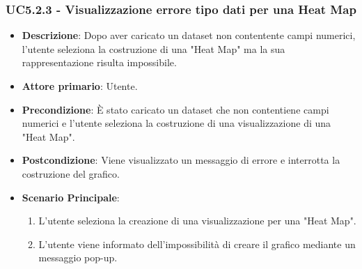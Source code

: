 \subsubsection{UC5.2.3 - Visualizzazione errore tipo dati per una Heat Map}
\label{subsec:uc5.1.2}
\begin{itemize}
    \item \textbf{Descrizione}: Dopo aver caricato un dataset non contentente campi numerici, 
                                l’utente seleziona la costruzione di una "Heat Map" ma 
                                la sua rappresentazione risulta impossibile.

    \item \textbf{Attore primario}: Utente.
    
    \item \textbf{Precondizione}:   È stato caricato un dataset che non contentiene campi numerici e l’utente 
                                    seleziona la costruzione di una visualizzazione di una "Heat Map".

    \item \textbf{Postcondizione}:  Viene visualizzato un messaggio di errore e interrotta la costruzione del grafico.
    
    \item \textbf{Scenario Principale}: 
    \begin{enumerate}
        \item L'utente seleziona la creazione di una visualizzazione per una "Heat Map".
        \item L'utente viene informato dell'impossibilità di creare il grafico mediante un messaggio pop-up.
    \end{enumerate}
\end{itemize}